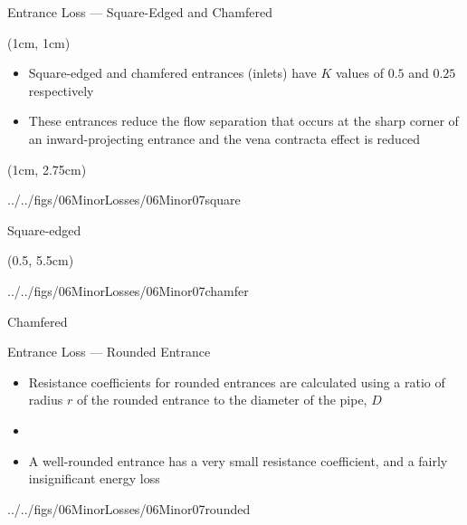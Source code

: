 \documentclass[9pt,xcolor={svgnames, x11names},professionalfonts, mathserif]{beamer}
\begin{document}

\begin{frame}{Entrance Loss --- Square-Edged and Chamfered}
 \begin{textblock*}{1\columnwidth}(1cm, 1cm)
  \begin{itemize}
   \item Square-edged and chamfered entrances (inlets) have $K$ values of $0.5$ and $0.25$ respectively

   \item These entrances reduce the flow separation that occurs at the sharp corner of an inward-projecting entrance and
         the vena contracta effect is reduced
  \end{itemize}
 \end{textblock*}

 \begin{textblock*}{0.55\columnwidth}(1cm, 2.75cm)
  \begin{cfig}[0.5]{../../figs/06MinorLosses/06Minor07square}\end{cfig}

  \centering
  \par\vspace{-0.75cm}
  Square-edged
 \end{textblock*}

 \begin{textblock*}{0.55\columnwidth}(0.5\columnwidth, 5.5cm)
  \begin{cfig}[0.5]{../../figs/06MinorLosses/06Minor07chamfer}\end{cfig}
  \centering
  \par\vspace{-0.75cm}
  Chamfered
 \end{textblock*}

\end{frame}


\begin{frame}{Entrance Loss --- Rounded Entrance}

 \begin{itemize}
  \item Resistance coefficients for rounded entrances are calculated using a ratio of radius $r$ of the rounded
        entrance to the diameter of the pipe, $D$
  \item []
  \item A well-rounded entrance has a very small resistance coefficient, and a fairly insignificant energy loss
 \end{itemize}
 \par\vspace{-0.5cm}
 \begin{cfig}[0.6]{../../figs/06MinorLosses/06Minor07rounded}\end{cfig}

\end{frame}
\end{document}
